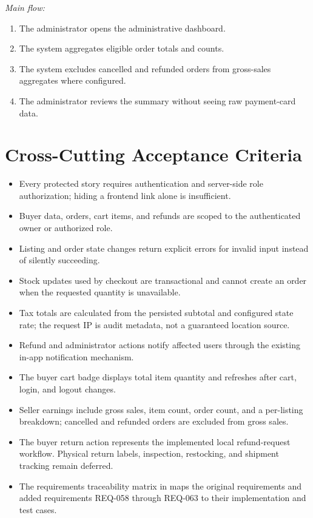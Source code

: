\documentclass[11pt]{scrreprt}
\newcommand{\code}[1]{\texttt{\detokenize{#1}}}
\begin{document}
\textit{Main flow:}
\begin{enumerate}
\item The administrator opens the administrative dashboard.
\item The system aggregates eligible order totals and counts.
\item The system excludes cancelled and refunded orders from gross-sales
aggregates where configured.
\item The administrator reviews the summary without seeing raw payment-card
data.
\end{enumerate}

\section{Cross-Cutting Acceptance Criteria}
\begin{itemize}
\item Every protected story requires authentication and server-side role
authorization; hiding a frontend link alone is insufficient.
\item Buyer data, orders, cart items, and refunds are
scoped to the authenticated owner or authorized role.
\item Listing and order state changes return explicit errors for invalid input
instead of silently succeeding.
\item Stock updates used by checkout are transactional and cannot create an
order when the requested quantity is unavailable.
\item Tax totals are calculated from the persisted subtotal and configured
state rate; the request IP is audit metadata, not a guaranteed location
source.
\item Refund and administrator actions notify affected users through the
existing in-app notification mechanism.
\item The buyer cart badge displays total item quantity and refreshes after
cart, login, and logout changes.
\item Seller earnings include gross sales, item count, order count, and a
per-listing breakdown; cancelled and refunded orders are excluded from gross
sales.
\item The buyer return action represents the implemented local refund-request
workflow. Physical return labels, inspection, restocking, and shipment
tracking remain deferred.
\item The requirements traceability matrix in \code{docs/RTM.csv} maps the
original requirements and added requirements REQ-058 through REQ-063 to their
implementation and test cases.
\end{itemize}
\end{document}

